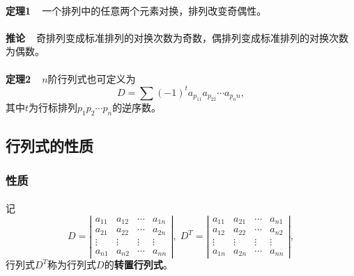 \paragraph{}
\textbf{定理1~~}一个排列中的任意两个元素对换，排列改变奇偶性。

\paragraph{}
\textbf{推论~~}奇排列变成标准排列的对换次数为奇数，偶排列变成标准排列的对换次数为偶数。

\paragraph{}
\textbf{定理2~~}$n$阶行列式也可定义为
\begin{equation*}
  D = \sum(-1)^ta_{p_11}a_{p_22}\cdots a_{p_nn},
\end{equation*}
其中$t$为行标排列$p_1p_2\cdots p_n$的逆序数。

\subsection{行列式的性质}
\subsubsection{性质}
\paragraph{}
记
\begin{equation*}
  D = \left|\begin{array}{cccc}
    a_{11} & a_{12} & \cdots & a_{1n} \\
    a_{21} & a_{22} & \cdots & a_{2n} \\
    \vdots & \vdots & \vdots & \vdots \\
    a_{n1} & a_{n2} & \cdots & a_{nn}
  \end{array} \right|, \;
  D^T = \left|\begin{array}{cccc}
    a_{11} & a_{21} & \cdots & a_{n1} \\
    a_{12} & a_{22} & \cdots & a_{n2} \\
    \vdots & \vdots & \vdots & \vdots \\
    a_{1n} & a_{2n} & \cdots & a_{nn}
  \end{array} \right|,
\end{equation*}
行列式$D^T$称为行列式$D$的\textbf{转置行列式}。

